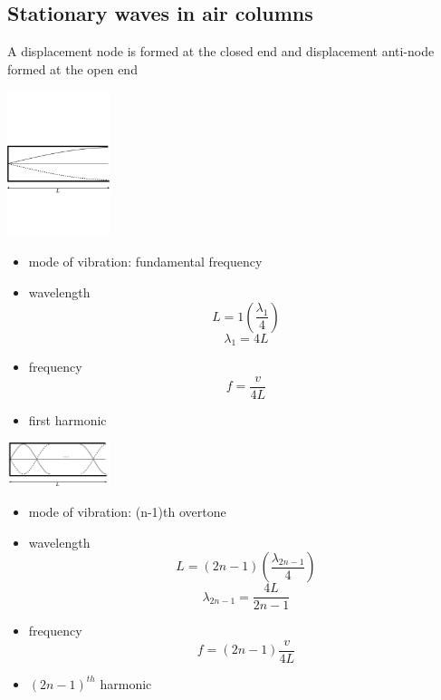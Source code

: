 \documentclass[a4paper, 10pt]{article}
\begin{document}
\subsection{Stationary waves in air columns}
A displacement node is formed at the closed end and displacement anti-node formed at the open end
\begin{framed}
\begin{minipage}{0.5\textwidth}
   \begin{center}
   \includegraphics[trim = 50 50 50 50, width=3cm]{figures/4.pdf} 
   \end{center}	
\end{minipage}	
\begin{minipage}{0.5\textwidth}
   \begin{itemize}
      \item mode of vibration: fundamental frequency 
      \item wavelength
         \[
            L = 1 \left( \frac{\lambda_1}{4} \right) 
         \]
         \[
         \lambda_1 = 4L
         \]
      \item frequency 
         \[
         f = \frac{v}{4L}
         \]
      \item first harmonic
   \end{itemize}	
\end{minipage}	 
\end{framed}	

\begin{framed}
\begin{minipage}{0.5\textwidth}
   \begin{center}
   \includegraphics[trim = 50 50 50 50, width=3cm]{figures/5.pdf} 
   \end{center}	
\end{minipage}	
\begin{minipage}{0.5\textwidth}
   \begin{itemize}
      \item mode of vibration: (n-1)th overtone 
      \item wavelength
         \[
            L = (2n-1) \left( \frac{\lambda_{2n-1}}{4} \right) 
         \]
         \[
            \lambda_{2n-1} = \frac{4L}{2n-1}
         \]
      \item frequency 
         \[
            f = (2n-1) \frac{v}{4L}
         \]
      \item $(2n-1)^{th}$ harmonic
   \end{itemize}	
\end{minipage}	
\end{framed}	
\end{document}

